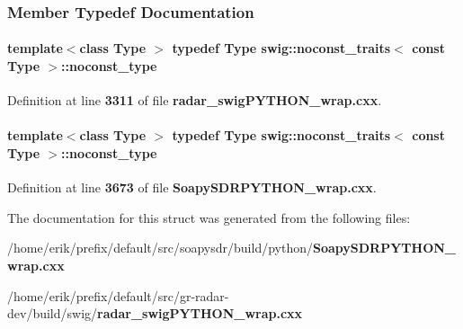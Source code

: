 \subsubsection{Member Typedef Documentation}
\paragraph[{noconst\+\_\+type}]{\setlength{\rightskip}{0pt plus 5cm}template$<$class Type $>$ typedef Type {\bf swig\+::noconst\+\_\+traits}$<$ const Type $>$\+::{\bf noconst\+\_\+type}}\label{structswig_1_1noconst__traits_3_01const_01Type_01_4_a47a8b24d65b72185304a9e51211f721f}


Definition at line {\bf 3311} of file {\bf radar\+\_\+swig\+P\+Y\+T\+H\+O\+N\+\_\+wrap.\+cxx}.

\paragraph[{noconst\+\_\+type}]{\setlength{\rightskip}{0pt plus 5cm}template$<$class Type $>$ typedef Type {\bf swig\+::noconst\+\_\+traits}$<$ const Type $>$\+::{\bf noconst\+\_\+type}}\label{structswig_1_1noconst__traits_3_01const_01Type_01_4_a47a8b24d65b72185304a9e51211f721f}


Definition at line {\bf 3673} of file {\bf Soapy\+S\+D\+R\+P\+Y\+T\+H\+O\+N\+\_\+wrap.\+cxx}.



The documentation for this struct was generated from the following files\+:\begin{DoxyCompactItemize}
\item 
/home/erik/prefix/default/src/soapysdr/build/python/{\bf Soapy\+S\+D\+R\+P\+Y\+T\+H\+O\+N\+\_\+wrap.\+cxx}\item 
/home/erik/prefix/default/src/gr-\/radar-\/dev/build/swig/{\bf radar\+\_\+swig\+P\+Y\+T\+H\+O\+N\+\_\+wrap.\+cxx}\end{DoxyCompactItemize}
